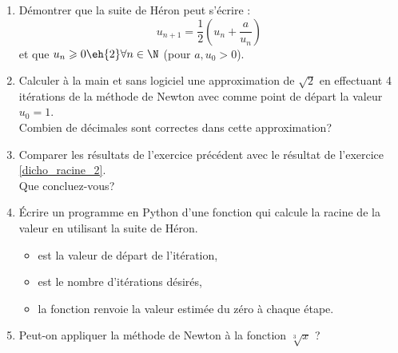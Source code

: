 \bigskip
\begin{boxexstheorieligne}
\begin{enumerate}[label=\textbf{E\thechapter.\arabic*},itemsep=2mm,resume=refexercices]
\item\label{alternative:Heron} Démontrer que la suite de Héron peut s'écrire :  $$u_{n+1} = \frac12 \left(u_n+\frac{a}{u_n}\right)\;$$ et que $u_n\geqslant 0 \eh{2} \forall n\in \N$ (pour  $a,u_0>0$). 
\item Calculer à la main et sans logiciel une approximation de $\sqrt{2}$ en effectuant 4 itérations de la méthode de Newton avec comme point de départ la valeur $u_0=1$.\\ Combien de décimales sont correctes dans cette approximation?
\item Comparer les résultats de l'exercice précédent avec le résultat de l'exercice \ref*{dicho_racine_2}.\\ Que concluez-vous?
\item Écrire un programme en Python d'une fonction  qui calcule la racine de la valeur  en utilisant la suite de Héron. 
\begin{itemize}
\item {} est la valeur de départ de l'itération,
\item {} est le nombre d'itérations désirés,
\item la fonction renvoie la valeur estimée du zéro à chaque étape.
\end{itemize}
\item Peut-on appliquer la méthode de Newton à la fonction $\sqrt[3]{x}$ ?
\end{enumerate}
\end{boxexstheorieligne}
\clearpage






